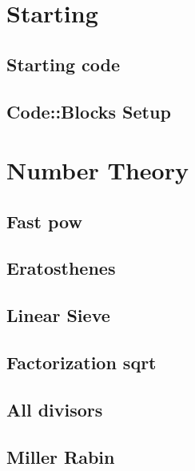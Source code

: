 \documentclass[a4paper,twocolumn]{extarticle}
\begin{document}
    \pagestyle{fancy}
    \fancyfoot{}

    {\fontsize{7.8pt}{8.5pt}\selectfont
        \tableofcontents
        \newpage
        \section{Starting}
        \subsection{Starting code}
        
        \subsection{Code::Blocks Setup}
        
        
        \section{Number Theory}
        \subsection{Fast pow}
        
        \subsection{Eratosthenes}
        
        \subsection{Linear Sieve}
        
        \subsection{Factorization sqrt}
        
        \subsection{All divisors}
        
        \subsection{Miller Rabin}
        
}
\end{document}
